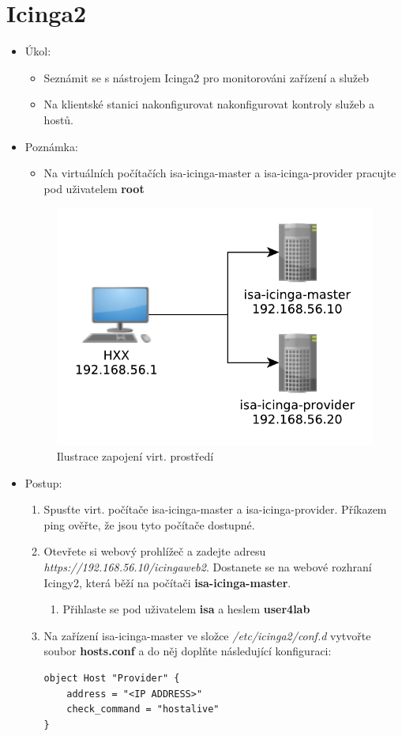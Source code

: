\section{Icinga2}
  \begin{itemize}
    \item Úkol: 
    \begin{itemize}
      \item Seznámit se s nástrojem Icinga2 pro monitorováni zařízení a služeb 
      \item Na klientské stanici nakonfigurovat nakonfigurovat kontroly služeb a hostů.  
    \end{itemize}
    \item Poznámka:
        \begin{itemize}
            \item Na virtuálních počítačích isa-icinga-master a isa-icinga-provider pracujte pod uživatelem {\bf root}
        \end{itemize}
		\begin{figure}[!ht]
			\caption{Ilustrace zapojení virt. prostředí}
			\centering
	    	\includegraphics*[width=0.5\linewidth]{files/vbox-network.pdf}
		\end{figure}
    \item Postup:
       \begin{enumerate}
       		\item Spusťte virt. počítače isa-icinga-master a isa-icinga-provider. Příkazem ping ověřte, že
       		jsou tyto počítače dostupné.
            \item Otevřete si webový prohlížeč a zadejte adresu 
            {\it https://192.168.56.10/icingaweb2}. Dostanete se na webové rozhraní Icingy2,
            která běží na počítači {\bf isa-icinga-master}.
               \begin{enumerate}
                   \item Přihlaste se pod uživatelem {\bf isa} a heslem {\bf user4lab}
               \end{enumerate}
            \item Na zařízení isa-icinga-master ve složce {\it /etc/icinga2/conf.d} vytvořte soubor {\bf hosts.conf} a do něj doplňte následující konfiguraci:
\begin{verbatim}
object Host "Provider" {
    address = "<IP ADDRESS>"
    check_command = "hostalive"
}


\end{verbatim}
\end{enumerate}
\end{itemize}
